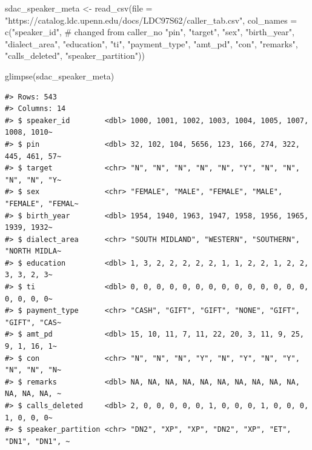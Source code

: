 \documentclass[
  letterpaper,
]{latex/krantz}
\newenvironment{Shaded}{\begin{snugshade}}{\end{snugshade}}
\newcommand{\AttributeTok}[1]{\textcolor[rgb]{0.40,0.45,0.13}{#1}}
\newcommand{\CommentTok}[1]{\textcolor[rgb]{0.37,0.37,0.37}{#1}}
\newcommand{\FunctionTok}[1]{\textcolor[rgb]{0.28,0.35,0.67}{#1}}
\newcommand{\NormalTok}[1]{\textcolor[rgb]{0.00,0.23,0.31}{#1}}
\newcommand{\OtherTok}[1]{\textcolor[rgb]{0.00,0.23,0.31}{#1}}
\newcommand{\StringTok}[1]{\textcolor[rgb]{0.13,0.47,0.30}{#1}}
\begin{document}
\begin{Shaded}
\begin{Highlighting}[]
\NormalTok{sdac\_speaker\_meta }\OtherTok{\textless{}{-}} 
  \FunctionTok{read\_csv}\NormalTok{(}\AttributeTok{file =} \StringTok{"https://catalog.ldc.upenn.edu/docs/LDC97S62/caller\_tab.csv"}\NormalTok{, }
           \AttributeTok{col\_names =} \FunctionTok{c}\NormalTok{(}\StringTok{"speaker\_id"}\NormalTok{, }\CommentTok{\# changed from \textasciigrave{}caller\_no\textasciigrave{}}
                         \StringTok{"pin"}\NormalTok{,}
                         \StringTok{"target"}\NormalTok{,}
                         \StringTok{"sex"}\NormalTok{,}
                         \StringTok{"birth\_year"}\NormalTok{,}
                         \StringTok{"dialect\_area"}\NormalTok{,}
                         \StringTok{"education"}\NormalTok{,}
                         \StringTok{"ti"}\NormalTok{,}
                         \StringTok{"payment\_type"}\NormalTok{,}
                         \StringTok{"amt\_pd"}\NormalTok{,}
                         \StringTok{"con"}\NormalTok{,}
                         \StringTok{"remarks"}\NormalTok{,}
                         \StringTok{"calls\_deleted"}\NormalTok{,}
                         \StringTok{"speaker\_partition"}\NormalTok{))}

\FunctionTok{glimpse}\NormalTok{(sdac\_speaker\_meta)}
\end{Highlighting}
\end{Shaded}

\begin{verbatim}
#> Rows: 543
#> Columns: 14
#> $ speaker_id        <dbl> 1000, 1001, 1002, 1003, 1004, 1005, 1007, 1008, 1010~
#> $ pin               <dbl> 32, 102, 104, 5656, 123, 166, 274, 322, 445, 461, 57~
#> $ target            <chr> "N", "N", "N", "N", "N", "Y", "N", "N", "N", "N", "Y~
#> $ sex               <chr> "FEMALE", "MALE", "FEMALE", "MALE", "FEMALE", "FEMAL~
#> $ birth_year        <dbl> 1954, 1940, 1963, 1947, 1958, 1956, 1965, 1939, 1932~
#> $ dialect_area      <chr> "SOUTH MIDLAND", "WESTERN", "SOUTHERN", "NORTH MIDLA~
#> $ education         <dbl> 1, 3, 2, 2, 2, 2, 2, 1, 1, 2, 2, 1, 2, 2, 3, 3, 2, 3~
#> $ ti                <dbl> 0, 0, 0, 0, 0, 0, 0, 0, 0, 0, 0, 0, 0, 0, 0, 0, 0, 0~
#> $ payment_type      <chr> "CASH", "GIFT", "GIFT", "NONE", "GIFT", "GIFT", "CAS~
#> $ amt_pd            <dbl> 15, 10, 11, 7, 11, 22, 20, 3, 11, 9, 25, 9, 1, 16, 1~
#> $ con               <chr> "N", "N", "N", "Y", "N", "Y", "N", "Y", "N", "N", "N~
#> $ remarks           <dbl> NA, NA, NA, NA, NA, NA, NA, NA, NA, NA, NA, NA, NA, ~
#> $ calls_deleted     <dbl> 2, 0, 0, 0, 0, 0, 1, 0, 0, 0, 1, 0, 0, 0, 1, 0, 0, 0~
#> $ speaker_partition <chr> "DN2", "XP", "XP", "DN2", "XP", "ET", "DN1", "DN1", ~
\end{verbatim}
\end{document}
